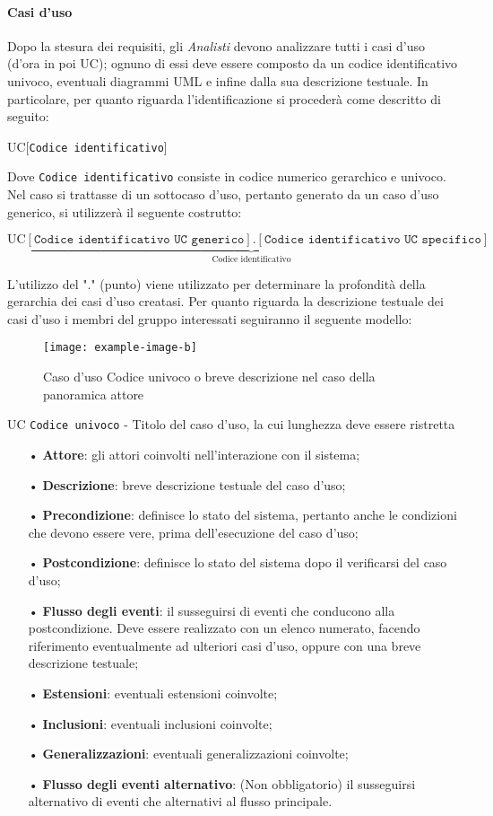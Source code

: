 \paragraph{Casi d'uso}
Dopo la stesura dei requisiti, gli \textit{Analisti} devono analizzare tutti i casi d'uso (d'ora in poi UC); ognuno di essi deve essere composto da un codice identificativo univoco, eventuali diagrammi UML e infine dalla sua descrizione testuale. In particolare, per quanto riguarda l'identificazione si procederà come descritto di seguito:
\begin{center}
UC[\texttt{Codice identificativo}]
\end{center}
Dove \texttt{Codice identificativo} consiste in codice numerico {gerarchico} e univoco.
Nel caso si trattasse di un {sottocaso d'uso}, pertanto generato da un caso d'uso generico, si utilizzerà il seguente costrutto:
\begin{center}
$\text{UC}\underbrace{[\texttt{Codice identificativo UC generico}].[\texttt{Codice identificativo UC specifico}]}_{\text{Codice   identificativo}}$
\end{center}
L'utilizzo del "." (punto) viene utilizzato per determinare la profondità della gerarchia dei casi d'uso creatasi.
Per quanto riguarda la descrizione testuale dei casi d'uso i membri del gruppo interessati seguiranno il seguente modello:
\begin{figure}[H]
\centering
\texttt{[image: example-image-b]}
\caption{Caso d'uso Codice univoco o breve descrizione nel caso della panoramica attore}
\end{figure}
UC \texttt{Codice univoco} - Titolo del caso d'uso, la cui lunghezza deve essere ristretta
\begin{itemize}
\item[•] \textbf{Attore}: gli attori coinvolti nell'interazione con il sistema;
\item[•] \textbf{Descrizione}: breve descrizione testuale del caso d'uso;
\item[•] \textbf{Precondizione}: definisce lo stato del sistema, pertanto anche le condizioni che devono essere vere, prima dell'esecuzione del caso d'uso; 
\item[•] \textbf{Postcondizione}: definisce lo stato del sistema dopo il verificarsi del caso d'uso; 
\item[•] \textbf{Flusso degli eventi}: il susseguirsi di eventi che conducono alla postcondizione. Deve essere realizzato con un elenco numerato, facendo riferimento eventualmente ad ulteriori casi d'uso, oppure con una breve descrizione testuale;
\item[•] \textbf{Estensioni}: eventuali estensioni coinvolte;
\item[•] \textbf{Inclusioni}: eventuali inclusioni coinvolte;
\item[•] \textbf{Generalizzazioni}: eventuali generalizzazioni coinvolte;
\item[•] \textbf{Flusso degli eventi alternativo}: (Non obbligatorio) il susseguirsi alternativo di eventi che alternativi al flusso principale.
\end{itemize}



